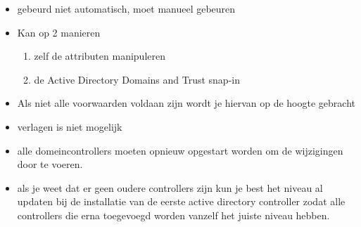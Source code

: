 \begin{itemize}
\item gebeurd niet automatisch, moet manueel gebeuren
\item Kan op 2 manieren
\begin{enumerate}
\item zelf de attributen manipuleren
\item de Active Directory Domains and Trust snap-in
\end{enumerate}
\item Als niet alle voorwaarden voldaan zijn wordt je hiervan op de hoogte gebracht
\item verlagen is niet mogelijk
\item alle domeincontrollers moeten opnieuw opgestart worden om de wijzigingen door te voeren.
\item als je weet dat er geen oudere controllers zijn kun je best het niveau al updaten bij de installatie van de eerste active directory controller zodat alle controllers die erna toegevoegd worden vanzelf het juiste niveau hebben.
\end{itemize}
